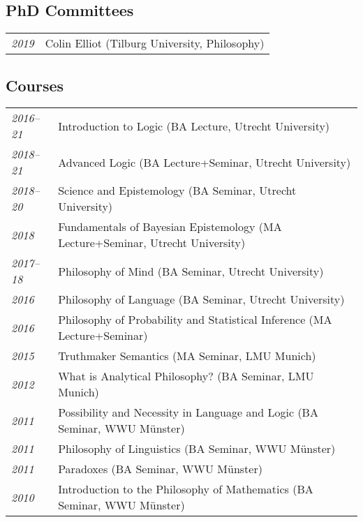 \subsection*{PhD Committees}

\begin{tabular}{p{.1\linewidth} p{.8\linewidth}}
  \emph{2019} & Colin Elliot (Tilburg University, Philosophy)\\
\end{tabular}

\subsection*{Courses}

\begin{longtable}{p{.1\linewidth} p{.9\linewidth}}
  \emph{2016--21} & Introduction to Logic (BA Lecture, Utrecht University)\\[1ex]
  \emph{2018--21} & Advanced Logic (BA Lecture+Seminar, Utrecht University)\\[1ex]
  \emph{2018--20} & Science and Epistemology (BA Seminar, Utrecht University)\\[1ex]
  \emph{2018}     & Fundamentals of Bayesian Epistemology (MA Lecture+Seminar, Utrecht University)\\[1ex]
  \emph{2017--18} & Philosophy of Mind (BA Seminar, Utrecht University)\\[1ex]
  \emph{2016}     & Philosophy of Language (BA Seminar, Utrecht University)\\[1ex]
  \emph{2016}     & Philosophy of Probability and Statistical Inference (MA Lecture+Seminar)\\[1ex]
  \emph{2015}     & Truthmaker Semantics (MA Seminar, LMU Munich)\\[1ex]
  \emph{2012}     & What is Analytical Philosophy? (BA Seminar, LMU Munich)\\[1ex]
  \emph{2011}     & Possibility and Necessity in Language and Logic (BA Seminar, WWU M\"unster)\\[1ex]
  \emph{2011}     & Philosophy of Linguistics (BA Seminar, WWU M\"unster)\\[1ex]
  \emph{2011}     & Paradoxes (BA Seminar, WWU M\"unster)\\[1ex]
  \emph{2010}     & Introduction to the Philosophy of Mathematics (BA Seminar, WWU M\"unster)\\
\end{longtable}

